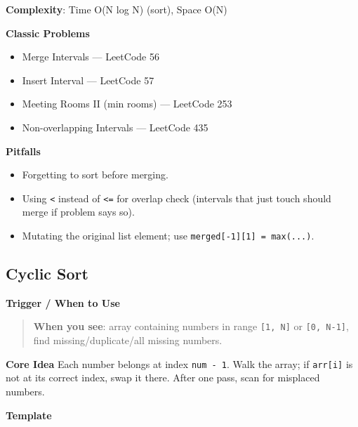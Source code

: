 \documentclass[11pt]{article}
\providecommand{\tightlist}{\setlength{\itemsep}{1pt}\setlength{\parskip}{0pt}}
\begin{document}
\textbf{Complexity}: Time O(N log N) (sort), Space O(N)

\textbf{Classic Problems}

\begin{itemize}
\tightlist
\item
  Merge Intervals --- LeetCode 56
\item
  Insert Interval --- LeetCode 57
\item
  Meeting Rooms II (min rooms) --- LeetCode 253
\item
  Non-overlapping Intervals --- LeetCode 435
\end{itemize}

\textbf{Pitfalls}

\begin{itemize}
\tightlist
\item
  Forgetting to sort before merging.
\item
  Using \texttt{\textless{}} instead of \texttt{\textless{}=} for overlap check (intervals that just touch should merge if problem says so).
\item
  Mutating the original list element; use \texttt{merged{[}-1{]}{[}1{]}\ =\ max(...)}.
\end{itemize}

\subsection{Cyclic Sort}\label{cyclic-sort}

\textbf{Trigger / When to Use}

\begin{quote}
\textbf{When you see}: array containing numbers in range \texttt{{[}1,\ N{]}} or \texttt{{[}0,\ N-1{]}}, find missing/duplicate/all missing numbers.
\end{quote}

\textbf{Core Idea}
Each number belongs at index \texttt{num\ -\ 1}. Walk the array; if \texttt{arr{[}i{]}} is not at its correct index, swap it there. After one pass, scan for misplaced numbers.

\textbf{Template}

\end{document}
